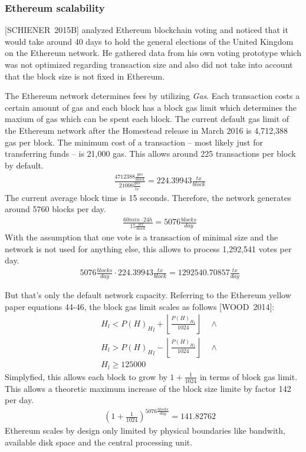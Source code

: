 \documentclass[9pt,oneside]{amsart}
\begin{document}
\begin{multicols}{2}
\subsubsection{Ethereum scalability}
[SCHIENER~2015B] analyzed Ethereum blockchain voting and noticed that it would take around 40 days to hold the general elections of the United Kingdom on the Ethereum network. He gathered data from his own voting prototype which was not optimized regarding transaction size and also did not take into account that the block size is not fixed in Ethereum.\par
The Ethereum network determines fees by utilizing \textit{Gas}. Each transaction costs a certain amount of gas and each block has a block gas limit which determines the maxium of gas which can be spent each block. The current default gas limit of the Ethereum network after the Homestead release in March 2016 is 4,712,388 gas per block. The minimum cost of a transaction -- most likely just for transferring funds -- is 21,000 gas. This allows around 225 transactions per block by default.
\begin{eqnarray}
& & \frac {4712388 \frac{gas}{block}}{21000\frac{gas}{tx}} = 224.39943 \frac{tx}{block}
\end{eqnarray}
The current average block time is 15 seconds. Therefore, the network generates around 5760 blocks per day.
\begin{eqnarray}
& & \frac{60 min \cdot 24 h}{15 \frac{sec}{block}} = 5076 \frac {blocks}{day}
\end{eqnarray}
With the assumption that one vote is a transaction of minimal size and the network is not used for anything else, this allows to process 1,292,541 votes per day.
\begin{eqnarray}
& & 5076 \frac {blocks}{day} \cdot 224.39943 \frac {tx} {block} = 1292540.70857 \frac{tx}{day}
\end{eqnarray}\par
But that's only the default network capacity. Referring to the Ethereum yellow paper equations 44-46, the block gas limit scales as follows [WOOD~2014]:
\begin{eqnarray}
& & H_l < {P(H)_H}_l + \left\lfloor\frac{{P(H)_H}_l}{1024}\right\rfloor \quad \wedge \\ %
& & H_l > {P(H)_H}_l - \left\lfloor\frac{{P(H)_H}_l}{1024}\right\rfloor \quad \wedge \\ %
& & H_l \geqslant 125000 %
\end{eqnarray}
Simplyfied, this allows each block to grow by $1 + \frac{1}{1024}$ in terms of block gas limit. This allows a theoretic maximum increase of the block size limite by factor 142 per day.
\begin{eqnarray}
& & \left( 1 + \frac{1}{1024} \right) ^ {5076 \frac {blocks}{day}} = 141.82762
\end{eqnarray}
Ethereum scales by design only limited by physical boundaries like bandwith, available disk space and the central processing unit.


\end{multicols}
\end{document}
